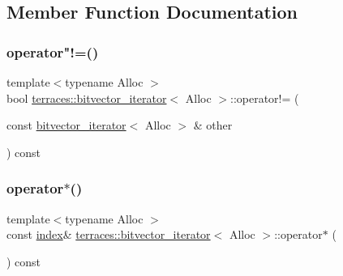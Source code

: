 \subsection{Member Function Documentation}
\mbox{\label{classterraces_1_1bitvector__iterator_aacb89a9a24c74fcaadefff23a5016ce0}} 
\subsubsection{\texorpdfstring{operator"!=()}{operator!=()}}
{\footnotesize\ttfamily template$<$typename Alloc $>$ \\
bool \hyperlink{classterraces_1_1bitvector__iterator}{terraces\+::bitvector\+\_\+iterator}$<$ Alloc $>$\+::operator!= (\begin{DoxyParamCaption}\item[{const \hyperlink{classterraces_1_1bitvector__iterator}{bitvector\+\_\+iterator}$<$ Alloc $>$ \&}]{other }\end{DoxyParamCaption}) const\hspace{0.3cm}{\ttfamily [inline]}}

\mbox{\label{classterraces_1_1bitvector__iterator_ae71cae069ce0644f658f71763b65c49d}} 
\subsubsection{\texorpdfstring{operator$\ast$()}{operator*()}}
{\footnotesize\ttfamily template$<$typename Alloc $>$ \\
const \hyperlink{namespaceterraces_adbc33ccb543d1634e96d0eb02e472c77}{index}\& \hyperlink{classterraces_1_1bitvector__iterator}{terraces\+::bitvector\+\_\+iterator}$<$ Alloc $>$\+::operator$\ast$ (\begin{DoxyParamCaption}{ }\end{DoxyParamCaption}) const\hspace{0.3cm}{\ttfamily [inline]}}

\mbox{\label{classterraces_1_1bitvector__iterator_ae20702cafbc74443374d264031481b30}} 
